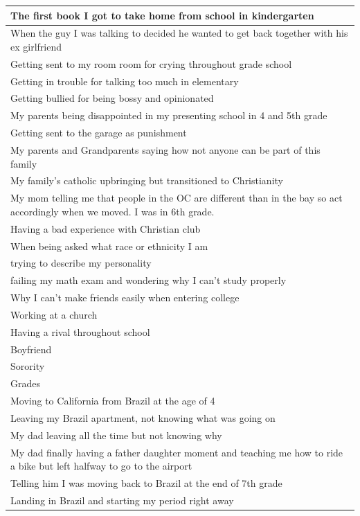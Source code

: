 \documentclass[
  .7em,
  letterpaper,
  DIV=11,
  numbers=noendperiod]{scrartcl}
\begin{document}
\begin{table}
\begin{tabular}{l}
\hline
The first book I got to take home from school in kindergarten\\
\hline
When the guy I was talking to decided he wanted to get back together with his ex girlfriend\\
\hline
Getting sent to my room room for crying throughout grade school\\
\hline
Getting in trouble for talking too much in elementary\\
\hline
Getting bullied for being bossy and opinionated\\
\hline
My parents being disappointed in my presenting school in 4 and 5th grade\\
\hline
Getting sent to the garage as punishment\\
\hline
My parents and Grandparents saying how not anyone can be part of this family\\
\hline
My family's catholic upbringing but transitioned to Christianity\\
\hline
My mom telling me that people in the OC are different than in the bay so act accordingly when we moved. I was in 6th grade.\\
\hline
Having a bad experience with Christian club\\
\hline
When being asked what race or ethnicity I am\\
\hline
trying to describe my personality\\
\hline
failing my math exam and wondering why I can't study properly\\
\hline
Why I can't make friends easily when entering college\\
\hline
Working at a church\\
\hline
Having a rival throughout school\\
\hline
Boyfriend\\
\hline
Sorority\\
\hline
Grades\\
\hline
Moving to California from Brazil at the age of 4\\
\hline
Leaving my Brazil apartment, not knowing what was going on\\
\hline
My dad leaving all the time but not knowing why\\
\hline
My dad finally having a father daughter moment and teaching me how to ride a bike but left halfway to go to the airport\\
\hline
Telling him I was moving back to Brazil at the end of 7th grade\\
\hline
Landing in Brazil and starting my period right away\\

\end{tabular}
\end{table}
\end{document}
